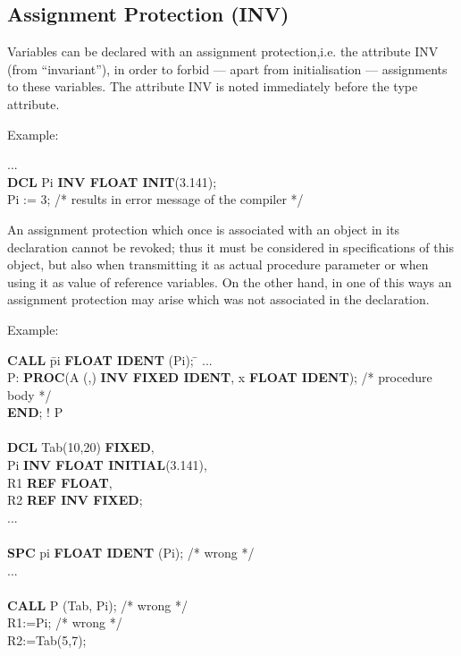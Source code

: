 \begin{tobedone}
\section{Assignment Protection (INV)}    %

Variables can be declared with an assignment protection,i.e. the attribute
INV (from ``invariant''), in order to forbid --- apart from
initialisation --- assignments to these variables. The attribute INV is
noted immediately before the type attribute.

Example:

...\\
{\bf DCL} Pi {\bf INV FLOAT INIT}(3.141);\\

Pi := 3;  /* results in error message of the compiler */

An assignment protection which once is associated with an object in its
declaration cannot be revoked; thus it must be considered in
specifications of this object, but also when transmitting it as actual
procedure parameter or when using it as value of reference variables. On
the other hand, in one of this ways an assignment protection may arise
which was not associated in the declaration.

Example:

\begin{tabbing}
{\bf CALL} \= pi {\bf FLOAT IDENT} (Pi); \= \kill
... \> \> \\
P:  \> {\bf PROC}(A (,) {\bf INV FIXED IDENT}, x {\bf FLOAT IDENT}); /* procedure body */ \> \\
    \> {\bf END}; ! P \> \\
    \> \> \\
{\bf DCL} \> Tab(10,20) {\bf FIXED}, \> \\
          \> Pi {\bf INV FLOAT INITIAL}(3.141), \> \\
          \> R1 {\bf REF FLOAT}, \> \\
          \> R2 {\bf REF INV FIXED}; \> \\
... \> \> \\
    \> \> \\
{\bf SPC} \> pi {\bf FLOAT IDENT} (Pi); \> /* wrong */ \\
... \> \> \\
    \> \> \\
{\bf CALL} \> P (Tab, Pi); \> /* wrong */ \\
R1:=Pi;    \>              \> /* wrong */ \\
R2:=Tab(5,7); \> \>
\end{tabbing}


\end{tobedone}
